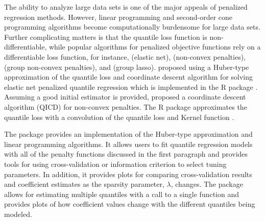 The ability to analyze large data sets is one of the major appeals of penalized regression methods. However, linear programming and second-order cone programming algorithms become computationally burdensome for large data sets. Further complicating matters is that the quantile loss function is non-differentiable, while popular algorithms for penalized objective functions rely on a differentiable loss function, for instance, \citet{friedman2009glmnet} (elastic net), \citet{scadAlg} (non-convex penalties), \citet{brehenyglasso} (group non-convex penalties), and \citet{Yang2015} (group lasso). \citet{huber_cd} proposed using a Huber-type approximation of the quantile loss and coordinate descent algorithm for solving elastic net penalized quantile regression which is implemented in the R package . Assuming a good initial estimator is provided, \citet{qr_cd} proposed a coordinate descent algorithm (QICD) for non-convex penalties. The R package  approximates the quantile loss with a convolution of the quantile loss and Kernel function \citep{lowdConv, highdConv}.

The package  provides an implementation of the Huber-type approximation and linear programming algorithms. It allows users to fit quantile regression models with all of the penalty functions discussed in the first paragraph and provides tools for using cross-validation or information criterion to select tuning parameters. In addition, it provides plots for comparing cross-validation results and coefficient estimates as the sparsity parameter, \(\lambda\), changes. The package allows for estimating multiple quantiles with a call to a single function and provides plots of how coefficient values change with the different quantiles being modeled.

